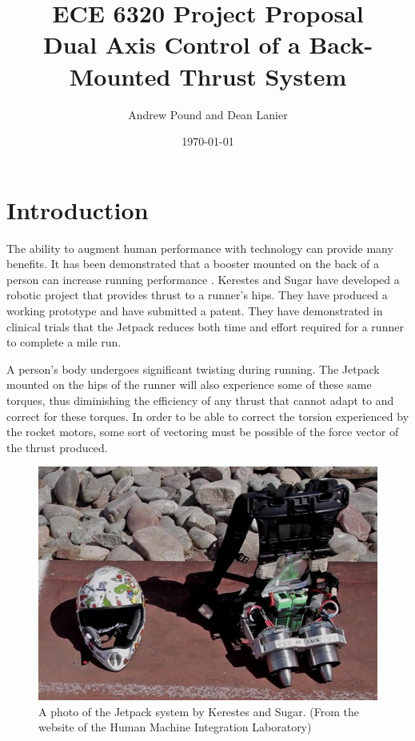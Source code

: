 \documentclass[12pt, twocolumn]{article}
\title{ECE 6320 Project Proposal\\
  Dual Axis Control of a Back-Mounted Thrust System
}
\author{Andrew Pound and Dean Lanier}
\date{\today}
\begin{document}
\maketitle



\section{Introduction}
The ability to augment human performance with technology can provide
many benefits.  It has been demonstrated that a booster mounted on the
back of a person can increase running performance
\cite{sugar2014systems}.  
Kerestes and Sugar have developed a robotic project that provides
thrust to a runner's hips.  They have produced a working prototype and
have submitted a patent\cite{sugar2014systems}. 
They have demonstrated in clinical trials  that the Jetpack reduces
both time and effort required for a runner to complete a mile run.

A person's body undergoes significant twisting during running.  The
Jetpack 
mounted on the hips of the runner will also experience some of these
same torques, thus diminishing the efficiency of any thrust that
cannot adapt to and correct for these torques.
In order to be able to correct the torsion experienced by the rocket
motors, some sort of vectoring must be possible of the force vector
of the thrust produced. 


\begin{figure}[tbh]
  \centering
  \includegraphics[width=.8\linewidth]{jetpack}
  \caption{A photo of the Jetpack system by Kerestes and Sugar.  (From
    the website of the Human Machine Integration Laboratory)} 
  \label{fig:jetpack}
\end{figure}
\end{document}
